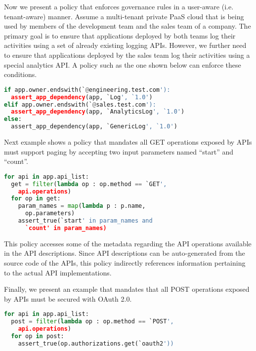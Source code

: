 Now we present a policy that enforces governance rules in a user-aware (i.e. tenant-aware) manner. Assume
a multi-tenant private PaaS cloud that is being used by members of the development
team and the sales team of a company. The primary goal is to ensure that applications deployed by both teams
log their activities using a set of already existing logging APIs. However, we further need to ensure that applications
deployed by the sales team log their activities using a special analytics API. A policy such as the one
shown below can enforce these conditions.

\vspace{0.05in}
{\footnotesize
\begin{lstlisting}[language=Python, frame=single, showstringspaces=false]
if app.owner.endswith(`@engineering.test.com'):
  assert_app_dependency(app, `Log', `1.0')
elif app.owner.endswith(`@sales.test.com'):
  assert_app_dependency(app, `AnalyticsLog', `1.0')
else:
  assert_app_dependency(app, `GenericLog', `1.0')
\end{lstlisting}
}
\vspace{0.05in} 

Next example shows a policy that mandates all GET operations exposed by APIs must support
paging by accepting two input parameters named ``start'' and ``count''. 

\vspace{0.05in}
{\footnotesize
\begin{lstlisting}[language=Python, frame=single, showstringspaces=false]
for api in app.api_list:
  get = filter(lambda op : op.method == `GET',  
    api.operations)
  for op in get:
    param_names = map(lambda p : p.name, 
      op.parameters)
    assert_true(`start' in param_names and 
      `count' in param_names)
\end{lstlisting}
}
\vspace{0.05in}

This policy accesses some of the metadata regarding the API operations available in the API descriptions.
Since API descriptions can be auto-generated from the source code of the APIs, this policy indirectly
references information pertaining to the actual API implementations.

Finally, we present an example that mandates that all POST operations exposed by APIs must be
secured with OAuth 2.0.

\vspace{0.05in}
{\footnotesize
\begin{lstlisting}[language=Python, frame=single, showstringspaces=false]
for api in app.api_list:
  post = filter(lambda op : op.method == `POST', 
  	api.operations)
  for op in post:
    assert_true(op.authorizations.get(`oauth2'))
\end{lstlisting}
}
\vspace{0.05in}

